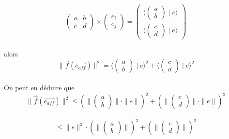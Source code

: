 \documentclass[a4paper, 12pt]{report}
\begin{document}
$$
\left(
		\begin{array}{cc}
		a & b \\
		c & d 
		\end{array}
		\right)
		\times
		\left(\begin{array}{c}
		e_{i} \\
		e_{j}
		\end{array}
		\right) =
		\left( 
		\begin{array}{c}
		\langle \left(\begin{array}{c}a \\ b \end{array} \right) \mid e \rangle		 \\
		\langle \left(\begin{array}{c}c \\ d \end{array} \right) \mid e \rangle	
		\end{array}
		\right)
		$$ \\
alors \\
$$ \parallel \overrightarrow{f}(\overrightarrow{e_{aff}}) \parallel ^{2} = \langle \left(\begin{array}{c}a \\ b \end{array} \right) \mid e \rangle ^{2} + \langle \left(\begin{array}{c}c \\ d \end{array} \right) \mid e \rangle ^{2} $$ \\
On peut en déduire que \\
$$ \parallel \overrightarrow{f}(\overrightarrow{e_{aff}}) \parallel ^{2} \le ( \parallel \left(\begin{array}{c}a \\ b \end{array} \right) \parallel \cdot \parallel e \parallel) ^{2} + ( \parallel \left(\begin{array}{c}c \\ d \end{array} \right) \parallel \cdot \parallel e \parallel) ^{2}$$ \\
$$ \le \parallel e \parallel ^{2} \cdot( \parallel \left(\begin{array}{c}a \\ b \end{array} \right) \parallel ) ^{2} + ( \parallel \left(\begin{array}{c}c \\ d \end{array} \right) \parallel) ^{2}$$ \\
\end{document}
